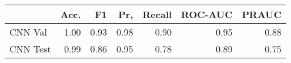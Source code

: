\begin{tabular}{lrrrrrr}
\toprule
{} &  Acc. &    F1 &   Pr, &  Recall &  ROC-AUC &  PRAUC \\
\midrule
CNN Val  &  1.00 &  0.93 &  0.98 &    0.90 &     0.95 &   0.88 \\
CNN Test &  0.99 &  0.86 &  0.95 &    0.78 &     0.89 &   0.75 \\
\bottomrule
\end{tabular}
